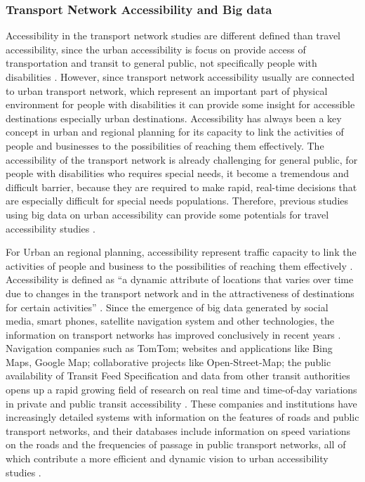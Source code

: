 \subsubsection{Transport Network Accessibility and Big data}
Accessibility in the transport network studies are different defined than travel 
accessibility, since the urban accessibility is focus on provide access of 
transportation and transit to general public, not specifically people with 
disabilities \cite{moya2016dynamic}. However, since transport network accessibility 
usually are connected to urban transport network, which represent an important 
part of physical environment for people with disabilities it can provide some insight for 
accessible destinations especially urban destinations. Accessibility has always been a key 
concept in urban and regional planning for its capacity to link the activities 
of people and businesses to the possibilities of reaching them effectively. 
The accessibility of the transport network is already challenging for general 
public, for people with disabilities who requires special needs, it become a 
tremendous and difficult barrier, because they are required to make rapid, 
real-time decisions that are especially difficult for special needs populations. 
Therefore, previous studies using big data on urban accessibility can provide 
some potentials for travel accessibility studies \cite{Barbeau}.

For Urban an regional planning, accessibility represent traffic capacity to link the 
activities of people and business to the possibilities of reaching them effectively 
\cite{moya2016dynamic}. Accessibility is defined as ``a dynamic attribute of locations
that varies over time due to changes in the transport network and in the attractiveness 
of destinations for certain activities'' \cite{moya2016dynamic}. Since the emergence of
big data generated by social media, smart phones, satellite navigation system and other 
technologies,  the information on transport networks has improved conclusively in recent 
years \cite{Barbeau}. Navigation companies such as TomTom; websites and applications 
like Bing Maps, Google Map; collaborative projects like Open-Street-Map; the public 
availability of Transit Feed Specification and data from other transit authorities 
opens up a rapid growing field of research on real time and time-of-day variations 
in private and public transit accessibility \cite{moya2016dynamic}. These companies 
and institutions have increasingly detailed systems with information on the features 
of roads and public transport networks, and their databases include information on 
speed variations on the roads and the frequencies of passage in public transport
networks, all of which contribute a more efficient and dynamic vision to urban 
accessibility studies \cite{moya2016dynamic}.

